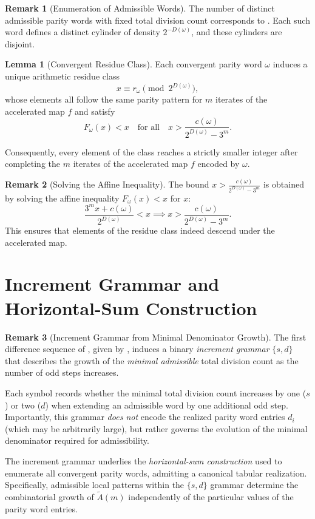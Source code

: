 \documentclass[12pt, oneside]{article}   	%
\numberwithin{equation}{section}          %
\theoremstyle{definition}
\newtheorem{lemma}[theorem]{Lemma}
\newtheorem*{remark}{Remark}
\begin{document}
\begin{remark}[Enumeration of Admissible Words]
The number of distinct admissible parity words with fixed total division
count corresponds to . Each such word defines a distinct
cylinder of density $2^{-D(\omega)}$, and these cylinders are disjoint.
\end{remark}

\begin{lemma}[Convergent Residue Class]
\label{lem:residue-class}
Each convergent parity word $\omega$ induces a unique arithmetic residue class
\[
x \equiv r_\omega \pmod{2^{D(\omega)}},
\]
whose elements all follow the same parity pattern for $m$ iterates of the
accelerated map $f$ and satisfy
\[
F_\omega(x) < x
\quad\text{for all}\quad
x > \frac{c(\omega)}{2^{D(\omega)} - 3^m}.
\]

Consequently, every element of the class reaches a strictly smaller integer
after completing the $m$ iterates of the accelerated map $f$ encoded by $\omega$.
\end{lemma}

\begin{remark}[Solving the Affine Inequality]
The bound 
\(\displaystyle x > \frac{c(\omega)}{2^{D(\omega)} - 3^m}\)
is obtained by solving the affine inequality \(F_\omega(x) < x\) for \(x\):
\[
\frac{3^m x + c(\omega)}{2^{D(\omega)}} < x \implies x > \frac{c(\omega)}{2^{D(\omega)} - 3^m}.
\]
This ensures that elements of the residue class indeed descend under the accelerated map.
\end{remark}


\newpage
\section{Increment Grammar and Horizontal-Sum Construction}
\label{sec:increment-grammar}

\begin{remark}[Increment Grammar from Minimal Denominator Growth]
The first difference sequence of , given by ,
induces a binary \emph{increment grammar} $\{s,d\}$ that describes the growth
of the \emph{minimal admissible} total division count as the number of odd steps increases.

Each symbol records whether the minimal total division count increases by one ($s$) or
two ($d$) when extending an admissible word by one additional odd step. Importantly, this
grammar \emph{does not} encode the realized parity word entries $d_i$ (which may be arbitrarily
large), but rather governs the evolution of the minimal denominator required for admissibility.

The increment grammar underlies the \emph{horizontal-sum construction} used to enumerate
all convergent parity words, admitting a canonical tabular realization. Specifically, admissible
local patterns within the $\{s,d\}$ grammar determine the combinatorial growth of $\widetilde A(m)$
independently of the particular values of the parity word entries.
\end{remark}
\end{document}
